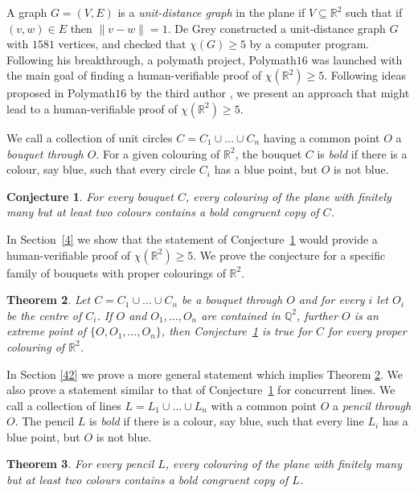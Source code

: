 \documentclass[12pt]{article}
\theoremstyle{plain}
\newtheorem{theorem}{Theorem}
\newtheorem{conjecture}[theorem]{Conjecture}
\theoremstyle{definition}
\begin{document}
A graph $G=(V,E)$ is a \emph{unit-distance graph} in the plane if $V\subseteq \mathbb{R}^2$ such that if $(v,w)\in E$ then $\|v-w\|=1$. De Grey constructed a unit-distance graph $G$ with $1581$ vertices, and checked that $\chi(G)\geq 5$ by a computer program. Following his breakthrough, a polymath project, Polymath$16$ \cite{polymath} was launched with the main goal of finding a human-verifiable proof of $\chi(\mathbb{R}^2)\geq 5$. Following ideas proposed in Polymath$16$ by the third author \cite{domotor}, we present an approach that might lead to a human-verifiable proof of $\chi(\mathbb{R}^2)\geq 5$. 


We call a collection of unit circles $C=C_1\cup\dots\cup C_n$ having a common point $O$ a \emph{bouquet through $O$}. For a given colouring of $\mathbb{R}^2$, the bouquet $C$ is \emph{bold} if there is a colour, say blue, such that every circle $C_i$ has a blue point, but $O$ is not blue.


\begin{conjecture}\label{introbouquet} For every bouquet $C$, every colouring of the plane with finitely many but at least two colours contains a bold congruent copy of $C$.
\end{conjecture}

In Section~\ref{4} we show that the statement of Conjecture~\ref{introbouquet} would provide a human-verifiable proof of $\chi(\mathbb{R}^2)\geq 5$. 
We prove the conjecture for a specific family of bouquets with proper colourings of $\mathbb{R}^2$.

\begin{theorem}\label{introracbouq}
Let $C=C_1\cup\dots\cup C_n$ be a bouquet through $O$ and for every $i$ let $O_i$ be the centre of $C_i$. If $O$ and $O_1,\dots,O_n$ are contained in $\mathbb{Q}^2$, further $O$ is an extreme point of $\{O,O_1,\dots,O_n\}$, then Conjecture~\ref{introbouquet} is true for $C$ for every proper colouring of $\mathbb{R}^2$.
\end{theorem}




In Section \ref{42} we prove a more general statement which implies Theorem \ref{introracbouq}. We also prove a statement similar to that of Conjecture~\ref{introbouquet} for concurrent lines. We call a collection of lines $L=L_1\cup\dots\cup L_n$ with a common point $O$ a \emph{pencil through $O$}. The pencil $L$ is \emph{bold} if there is a colour, say blue, such that every line $L_i$ has a blue point, but $O$ is not blue.

\begin{theorem}\label{intropencil} For every pencil $L$, every colouring of the plane with finitely many but at least two colours contains a bold congruent copy of $L$.
\end{theorem}
\end{document}
